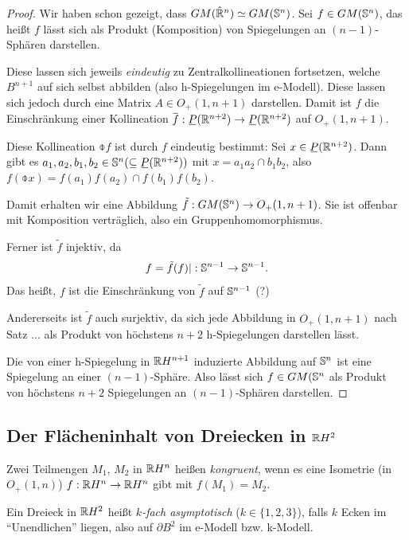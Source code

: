 \begin{proof}
 Wir haben schon gezeigt, dass $GM(\hat{\mathbb{R}}^n) \simeq GM( \mathbb{S}^n )$. Sei $f \in GM(\mathbb{S}^n)$, das heißt $f$ lässt sich als Produkt (Komposition) von Spiegelungen an $(n-1)$-Sphären darstellen.
 
 Diese lassen sich jeweils \emph{eindeutig} zu Zentralkollineationen fortsetzen, welche $B^{n+1}$ auf sich selbst abbilden (also h-Spiegelungen im e-Modell). Diese lassen sich jedoch durch eine Matrix $A \in O_+(1,n+1)$ darstellen. Damit ist $f$ die Einschränkung einer Kollineation $\obar{f}: \proj(\real^{n+2}) \to \proj(\real^{n+2})$ auf $O_+(1,n+1)$. 
 
 Diese Kollineation $\obar{f}$ ist durch $f$ eindeutig bestimmt: Sei $x \in \proj(\real^{n+2})$. Dann gibt es $a_1, a_2, b_1, b_2 \in \sphere^n (\subseteq \proj( \real^{n+2} ) )$ mit $x = a_1 a_2 \cap b_1 b_2$, also $f(\obar{x}) = f(a_1) f(a_2) \cap f(b_1) f(b_2)$.
 
 Damit erhalten wir eine Abbildung $\tilde{f}: GM(\mathbb{S}^n) \to O_+(1,n+1)$. Sie ist offenbar mit Komposition verträglich, also ein Gruppenhomomorphismus. 
 
 Ferner ist $\tilde{f}$ injektiv, da
 \[ f = \tilde{f}(f) | : \mathbb{S}^{n-1} \to \mathbb{S}^{n-1}. \]
 Das heißt, $f$ ist die Einschränkung von $\tilde{f}$ auf $\mathbb{S}^{n-1}$ (?)
 
 Andererseits ist $\tilde{f}$ auch surjektiv, da sich jede Abbildung in $O_+(1, n+1)$ nach Satz ... als Produkt von höchstens $n+2$ h-Spiegelungen darstellen lässt.
 
 Die von einer h-Spiegelung in $\mathbb{R} H^{n+1}$ induzierte Abbildung auf $\mathbb{S}^n$ ist eine Spiegelung an einer $(n-1)$-Sphäre. Also lässt sich $f \in GM( \mathbb{S}^n$ als Produkt von höchstens $n+2$ Spiegelungen an $(n-1)$-Sphären darstellen.
\end{proof}

\subsection{Der Flächeninhalt von Dreiecken in \texorpdfstring{$\mathbb{R} H^2$}{IRH2}}
\begin{defn*}
 Zwei Teilmengen $M_1$, $M_2$ in $\mathbb{R} H^n$ heißen \emph{kongruent}, wenn es eine Isometrie (in $O_+(1,n)$) $f: \mathbb{R} H^n \to \mathbb{R} H^n$ gibt mit $f(M_1) = M_2$.
 
 Ein Dreieck in $\mathbb{R} H^2$ heißt \emph{$k$-fach asymptotisch} ($k \in \{ 1, 2, 3 \}$), falls $k$ Ecken im ``Unendlichen'' liegen, also auf $\partial B^2$ im e-Modell bzw. k-Modell.
\end{defn*}

